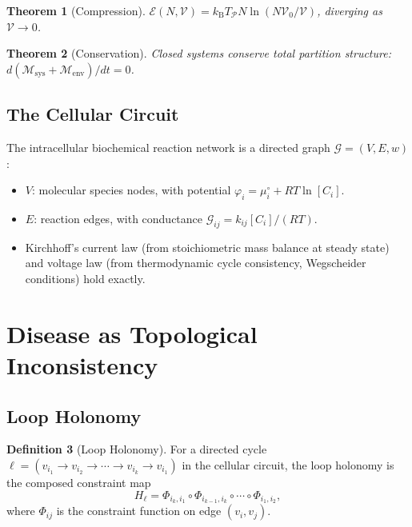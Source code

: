 \documentclass[twocolumn,10pt,a4paper]{article}
\newtheorem{theorem}{Theorem}[section]
\theoremstyle{definition}
\newtheorem{definition}[theorem]{Definition}
\theoremstyle{remark}
\newcommand{\kB}{k_{\mathrm{B}}}
\newcommand{\Depth}{\mathcal{M}}
\newcommand{\Gcond}{\mathcal{G}}
\newcommand{\Partition}{\mathcal{P}}
\newcommand{\Hol}{H}
\begin{document}
\begin{theorem}[Compression]
$\mathcal{E}(N,\mathcal{V}) = \kB T_\Partition N\ln(N\mathcal{V}_0/\mathcal{V})$, diverging as $\mathcal{V}\to 0$.
\end{theorem}

\begin{theorem}[Conservation]
Closed systems conserve total partition structure: $d(\Depth_{\mathrm{sys}} + \Depth_{\mathrm{env}})/dt = 0$.
\end{theorem}

\subsection{The Cellular Circuit}

The intracellular biochemical reaction network is a directed graph $\Gcond = (V, E, w)$:
\begin{itemize}[leftmargin=*,nosep]
    \item $V$: molecular species nodes, with potential $\varphi_i = \mu_i^\circ + RT\ln[C_i]$.
    \item $E$: reaction edges, with conductance $\Gcond_{ij} = k_{ij}[C_i]/(RT)$.
    \item Kirchhoff's current law (from stoichiometric mass balance at steady state) and voltage law (from thermodynamic cycle consistency, Wegscheider conditions) hold exactly.
\end{itemize}

\section{Disease as Topological Inconsistency}

\subsection{Loop Holonomy}

\begin{definition}[Loop Holonomy]
For a directed cycle $\ell = (v_{i_1}\to v_{i_2}\to\cdots\to v_{i_k}\to v_{i_1})$ in the cellular circuit, the loop holonomy is the composed constraint map
\begin{equation}
    \Hol_\ell = \Phi_{i_k,i_1}\circ\Phi_{i_{k-1},i_k}\circ\cdots\circ\Phi_{i_1,i_2},
\end{equation}
where $\Phi_{ij}$ is the constraint function on edge $(v_i,v_j)$.
\end{definition}
\end{document}

